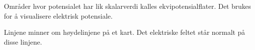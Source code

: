 Områder hvor potensialet har lik skalarverdi kalles ekvipotensialflater.
Det brukes for å visualisere elektrisk potensiale.

Linjene minner om høydelinjene på et kart.
Det elektriske feltet står normalt på disse linjene.
